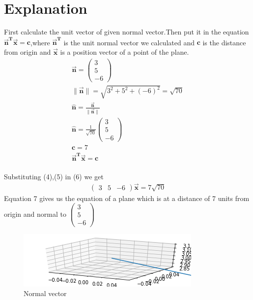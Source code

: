 \documentclass[journal,12pt,twocolumn]{IEEEtran}
\newcommand{\norm}[1]{\| #1 \|}
\begin{document}
\section{Explanation}
First calculate the unit vector of given normal vector.Then put it in the equation $\bm{ \vec{n}^T\vec{x}} = \bm{c}$,where $\bm{\vec{n}^T}$ is the unit normal vector we calculated and $\bm{c}$ is the distance from origin and $\bm{\vec{x}}$ is a position vector of a point of the plane.
\vspace{2mm}
\begin{align}
    \bm{\vec{n}}=\begin{pmatrix}3\\5\\-6\end{pmatrix}\\
    \bm{\norm{\vec{n}}}=\sqrt{3^2+5^2+(-6)^2}=\sqrt{70}\\
    \bm{\hat{n}}=\bm{\frac{\vec{n}}{\norm{\vec{n}}}}\\
    \bm{\hat{n}}=\frac{1}{\sqrt{70}}\begin{pmatrix}3\\5\\-6\end{pmatrix}\\
    \bm{c}=7\\
    \bm{\vec{n}^T\vec{x}} =\bm{c}
\end{align}
\vspace{2mm}\\
Substituting (4),(5) in (6) we get\\
\begin{align}
    \boxed{\begin{pmatrix}3 & 5 & -6\end{pmatrix}\bm{\vec{x}}=7\sqrt{70}}
\end{align}
Equation 7 gives us the equation of a plane which is at a distance of 7 units from origin and normal to $\begin{pmatrix}3\\5\\-6\end{pmatrix}$
\begin{figure}[h!]
	\centering
	\includegraphics[width=\columnwidth]{vector.png}
	\caption{Normal vector}
	\label{myfig1}
\end{figure}
\end{document}
